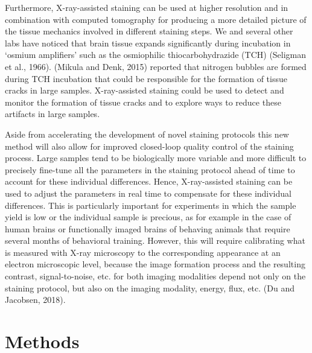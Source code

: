 \documentclass{article}
\begin{document}
Furthermore, X-ray-assisted staining can be used at higher resolution and in combination with computed tomography for producing a more detailed picture of the tissue mechanics involved in different staining steps. We and several other labs have noticed that brain tissue expands significantly during incubation in ‘osmium amplifiers’ such as the osmiophilic thiocarbohydrazide (TCH) (Seligman et al., 1966). (Mikula and Denk, 2015) reported that nitrogen bubbles are formed during TCH incubation that could be responsible for the formation of tissue cracks in large samples. X-ray-assisted staining could be used to detect and monitor the formation of tissue cracks and to explore ways to reduce these artifacts in large samples.

Aside from accelerating the development of novel staining protocols this new method will also allow for improved closed-loop quality control of the staining process. Large samples tend to be biologically more variable and more difficult to precisely fine-tune all the parameters in the staining protocol ahead of time to account for these individual differences. Hence, X-ray-assisted staining can be used to adjust the parameters in real time to compensate for these individual differences. This is particularly important for experiments in which the sample yield is low or the individual sample is precious, as for example in the case of human brains or functionally imaged brains of behaving animals that require several months of behavioral training. However, this will require calibrating what is measured with X-ray microscopy to the corresponding appearance at an electron microscopic level, because the image formation process and the resulting contrast, signal-to-noise, etc. for both imaging modalities depend not only on the staining protocol, but also on the imaging modality, energy, flux, etc. (Du and Jacobsen, 2018).

\section*{Methods}
\end{document}
